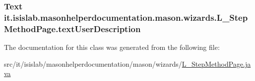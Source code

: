 \hypertarget{classit_1_1isislab_1_1masonhelperdocumentation_1_1mason_1_1wizards_1_1_l___step_method_page_a7cb65b64022898b986f913f4a7ae43d3}{
\subsubsection[{text\-User\-Description}]{\setlength{\rightskip}{0pt plus 5cm}Text it.\-isislab.\-masonhelperdocumentation.\-mason.\-wizards.\-L\-\_\-\-Step\-Method\-Page.\-text\-User\-Description\hspace{0.3cm}{\ttfamily [private]}}}\label{classit_1_1isislab_1_1masonhelperdocumentation_1_1mason_1_1wizards_1_1_l___step_method_page_a7cb65b64022898b986f913f4a7ae43d3}


The documentation for this class was generated from the following file\-:\begin{DoxyCompactItemize}
\item 
src/it/isislab/masonhelperdocumentation/mason/wizards/\hyperlink{_l___step_method_page_8java}{L\-\_\-\-Step\-Method\-Page.\-java}\end{DoxyCompactItemize}
